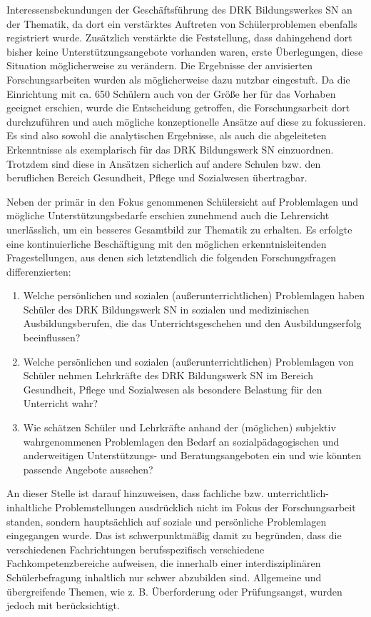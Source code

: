 Interessensbekundungen der Geschäftsführung des DRK Bildungswerkes SN an der Thematik, da dort ein verstärktes Auftreten von Schülerproblemen ebenfalls registriert wurde. Zusätzlich verstärkte die Feststellung, dass dahingehend dort bisher keine Unterstützungsangebote vorhanden waren, erste Überlegungen, diese Situation möglicherweise zu verändern. Die Ergebnisse der anvisierten Forschungsarbeiten wurden als möglicherweise dazu nutzbar eingestuft. Da die Einrichtung mit ca. 650 Schülern auch von der Größe her für das Vorhaben geeignet erschien, wurde die Entscheidung getroffen, die Forschungsarbeit dort durchzuführen und auch mögliche konzeptionelle Ansätze auf diese zu fokussieren. Es sind also sowohl die analytischen Ergebnisse, als auch die abgeleiteten Erkenntnisse als exemplarisch für das DRK Bildungswerk SN einzuordnen. Trotzdem sind diese in Ansätzen sicherlich auf andere Schulen bzw. den beruflichen Bereich Gesundheit, Pflege und Sozialwesen übertragbar. 

Neben der primär in den Fokus genommenen Schülersicht auf Problemlagen und mögliche Unterstützungsbedarfe erschien zunehmend auch die Lehrersicht unerlässlich, um ein besseres Gesamtbild zur Thematik zu erhalten. Es erfolgte eine kontinuierliche Beschäftigung mit den möglichen erkenntnisleitenden Fragestellungen, aus denen sich letztendlich die folgenden Forschungsfragen differenzierten:

\begin{enumerate}
	\item Welche persönlichen und sozialen (außerunterrichtlichen) Problemlagen haben Schüler des DRK Bildungswerk SN in sozialen und medizinischen Ausbildungsberufen, die das Unterrichtsgeschehen und den Ausbildungserfolg beeinflussen?
	\item Welche persönlichen und sozialen (außerunterrichtlichen) Problemlagen von Schüler nehmen Lehrkräfte des DRK Bildungswerk SN im Bereich Gesundheit, Pflege und Sozialwesen als besondere Belastung für den Unterricht wahr?
	\item Wie schätzen Schüler und Lehrkräfte anhand der (möglichen) subjektiv wahrgenommenen Problemlagen den Bedarf an sozialpädagogischen und anderweitigen Unterstützungs- und Beratungsangeboten ein und wie könnten passende Angebote aussehen?
\end{enumerate}

\noindent
An dieser Stelle ist darauf hinzuweisen, dass fachliche bzw. unterrichtlich-inhaltliche Problemstellungen ausdrücklich nicht im Fokus der Forschungsarbeit standen, sondern hauptsächlich auf soziale und persönliche Problemlagen eingegangen wurde. Das ist schwerpunktmäßig damit zu begründen, dass die verschiedenen Fachrichtungen berufsspezifisch verschiedene Fachkompetenzbereiche aufweisen, die innerhalb einer interdisziplinären Schülerbefragung inhaltlich nur schwer abzubilden sind. Allgemeine und übergreifende Themen, wie z. B. Überforderung oder Prüfungsangst, wurden jedoch mit berücksichtigt.\\

